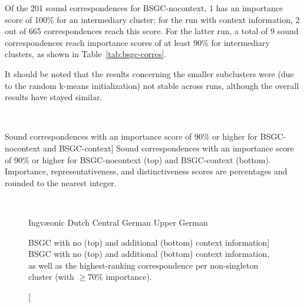 \documentclass[a4paper]{article}
\def\upper{\color{purple}\FilledBigTriangleUp}
\def\central{\color{midblue}\FilledBigSquare}
\def\dutch{\color{green}\FilledBigCircle}
\def\ingv{\color{green}\BigCircle}
\begin{document}
Of the 201 sound correspondences for BSGC-nocontext,
1 has an importance score of 100\% for an intermediary cluster;
for the run with context information, 2 out of 665 correspondences reach this score.
For the latter run, a total of 9 sound correspondences
reach importance scores of at least 90\%
for intermediary clusters, as shown in Table~\ref{tab:bsgc-corres}.

It should be noted that the results concerning
the smaller subclusters were
(due to the random k-means initialization) not stable
across runs, although the overall results have stayed similar.

\begin{table}[h]
\begin{adjustwidth}{-1cm}{-1cm}
\centering
\\
\vspace{1.5em}

\end{adjustwidth}
\caption
[Sound correspondences with an importance score
of 90\% or higher for BSGC-nocontext and BSGC-context]
{Sound correspondences with an importance score
of 90\% or higher for BSGC-nocontext (top) and BSGC-context (bottom).
Importance, representativeness, and distinctiveness scores are percentages
and rounded to the nearest integer.
}
\label{tab:bsgc-corres}
\end{table}

\begin{figure}[h]
\begin{adjustwidth}{-1.5cm}{-1cm}
\centering
\\
\vspace{1.5em}

\end{adjustwidth}

\vspace{0.5em}
\begin{center}
{\ingv} Ingv\ae{}onic \hspace{1em}
{\dutch} Dutch \hspace{1em}
{\central} Central German \hspace{1em}
{\upper} Upper German
\end{center}
\caption
[BSGC with no (top) and additional (bottom) context information]
{BSGC with no (top) and additional (bottom) context information,
as well as the highest-ranking correspondence per non-singleton cluster
(with $\geq$70\% importance).}
\label{fig:bsgc-trees}
\end{figure}
\end{document}
